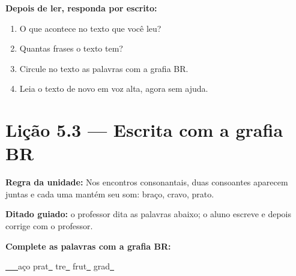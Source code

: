 \textbf{Depois de ler, responda por escrito:}
\begin{enumerate}

  \item O que acontece no texto que você leu?
  \begin{center}
  \underline{\hspace{12cm}}
  \end{center}

  \item Quantas frases o texto tem?
  \begin{center}
  \underline{\hspace{12cm}}
  \end{center}

  \item Circule no texto as palavras com a grafia BR.

  \item Leia o texto de novo em voz alta, agora sem ajuda.

\end{enumerate}

\section{Lição 5.3 --- Escrita com a grafia BR}

\noindent\textbf{Regra da unidade:} Nos encontros consonantais, duas consoantes aparecem juntas e cada uma mantém seu som: braço, cravo, prato.


\noindent\textbf{Ditado guiado:} o professor dita as palavras abaixo; o aluno escreve e depois corrige com o professor.

\begin{center}
  \underline{\hspace{2.3cm}} \quad \underline{\hspace{2.3cm}} \quad \underline{\hspace{2.3cm}} \quad \underline{\hspace{2.3cm}}

  \underline{\hspace{2.3cm}} \quad \underline{\hspace{2.3cm}} \quad \underline{\hspace{2.3cm}} \quad \underline{\hspace{2.3cm}}
\end{center}

\noindent\textbf{Complete as palavras com a grafia BR:}
\begin{center}
  \underline{~~~}aço \quad prat\underline{~} \quad tre\underline{~} \quad frut\underline{~} \quad grad\underline{~}
\end{center}

